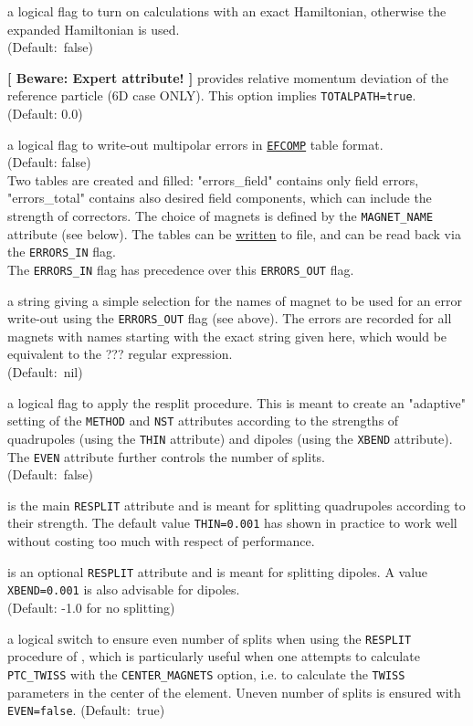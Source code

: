 \begin{madlist}
   a logical flag to turn on calculations with an exact
  Hamiltonian, otherwise the expanded Hamiltonian is used. \\
  (Default:~false)

   \textbf{[ Beware: Expert attribute! ]}
  provides relative momentum deviation of the reference particle (6D case
  ONLY). This option implies \texttt{TOTALPATH=true}. \\
  (Default: 0.0)

   a logical flag to write-out multipolar errors
  in \hyperref[sec:efcomp]{\texttt{EFCOMP}} table format.
  \\ (Default: false) \\
  Two tables are created and filled: "errors\_field" contains only
  field errors, "errors\_total" contains also desired field
  components, which can include the strength of correctors.
  The choice of magnets is defined by the \texttt{MAGNET\_NAME}
  attribute (see below).
  The tables can be \hyperref[sec:write]{written} to file, and can be
  read back via the \texttt{ERRORS\_IN} flag.\\
  The \texttt{ERRORS\_IN} flag has precedence over this \texttt{ERRORS\_OUT} flag.

   a string giving a simple selection for the
  names of magnet to be used for an error write-out using the
  \texttt{ERRORS\_OUT} flag (see above). The errors are recorded for all
  magnets with names starting with the exact string given here, which
  would be equivalent to the ??? regular expression.\\
  (Default:~nil)

   a logical flag to apply the \ptc resplit
  procedure. This is meant to create an "adaptive" setting of the
  \texttt{METHOD} and \texttt{NST} attributes according to the strengths
  of quadrupoles (using the \texttt{THIN}  attribute) and dipoles (using
  the \texttt{XBEND} attribute). The \texttt{EVEN} attribute further
  controls the number of splits.  \\
  (Default:~false)

   is the main \texttt{RESPLIT} attribute and is meant for
  splitting quadrupoles according to their strength. The default value
  \texttt{THIN=0.001} has shown in practice to work well without costing
  too much with respect of performance.

   is an optional \texttt{RESPLIT} attribute and is meant for
  splitting dipoles. A value \texttt{XBEND=0.001} is also advisable for
  dipoles. \\
  (Default: -1.0 for no splitting)

   a logical switch to ensure even number of splits when
  using the \texttt{RESPLIT}  procedure of \ptc, which is particularly
  useful when one attempts to calculate \texttt{PTC\_TWISS} with the
  \texttt{CENTER\_MAGNETS} option, i.e. to calculate the \texttt{TWISS}
  parameters in the center of the element.
  Uneven number of splits is ensured with \texttt{EVEN=false}.
  (Default:~true)
\end{madlist}

